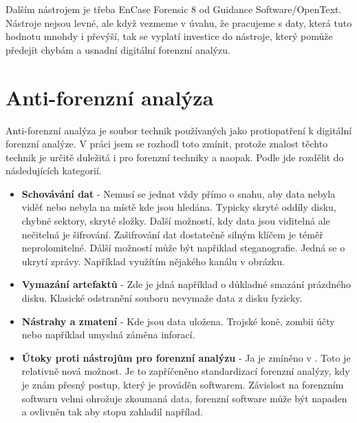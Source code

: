 \documentclass[thesis=B,czech]{FITthesis}[2012/06/26]
\begin{document}
Dalším nástrojem je třeba EnCase Forensic 8 od Guidance Software/OpenText. Nástroje nejsou levné, ale když vezmeme v úvahu, že pracujeme s daty, která tuto hodnotu mnohdy i převýší, tak se vyplatí investice do nástroje, který pomůže předejít chybám a usnadní digitální forenzní analýzu.

\chapter{Anti-forenzní analýza}

Anti-forenzní analýza je soubor technik používaných jako protiopatření k digitální forenzní analýze. V práci jsem se rozhodl toto zmínit, protože znalost těchto technik je určitě duležitá i pro forenzní techniky a naopak. Podle \cite{anti-prezi} jde rozdělit do následujících kategorií.

\begin{itemize}

\item \textbf{Schovávání dat} - Nemusí se jednat vždy přímo o snahu, aby data nebyla viděť nebo nebyla na místě kde jsou hledána. Typicky skryté oddíly disku, chybné sektory, skryté složky. Další možností, kdy data jsou viditelná ale nečitelná je šifrování. Zašifrování dat dostatečně silným klíčem je téměř neprolomitelné. Dálší možností může být napřiklad steganografie. Jedná se o ukrytí zprávy. Například využítím nějakého kanálu v obrázku.
\item \textbf{Vymazání artefaktů} - Zde je jdná například o důkladné smazání prázdného disku. Klasické odstranění souboru nevymaže data z disku fyzicky. 
\item \textbf{Nástrahy a zmatení} - Kde jsou data uložena. Trojské koně, zombii účty nebo například umyslná záměna inforací. 
\item \textbf{Útoky proti nástrojům pro forenzní analýzu} - Ja je zmíněno v \cite{anti-prezi}. Toto je relativně nová možnost. Je to zapříčeněno standardizací forenzní analýzy, kdy je znám přesný postup, který je prováděn softwarem. Závislost na forenzním softwaru velmi ohrožuje zkoumaná data, forenzní software může být napaden a ovlivněn tak aby stopu zahladil napřílad. 

\end{itemize}
\end{document}
